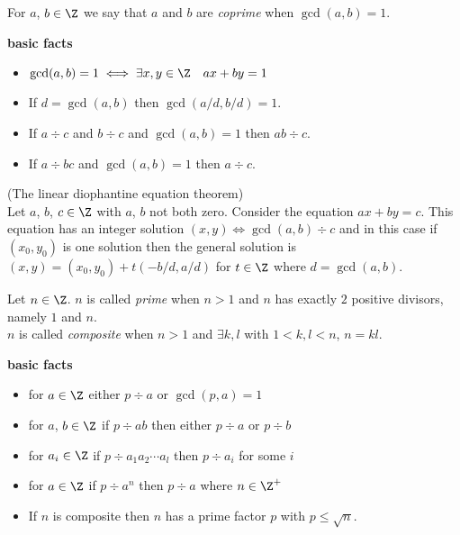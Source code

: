  For $a$, $b\in\Z$ we say that $a$ and $b$ are \emph{coprime} when $\gcd(a,b)=1$.

\textbf{basic facts}
\begin{itemize}
\item[] $\gcd(a,b)=1\iff\exists x,y\in\Z\quad ax+by=1$
\item[] If $d=\gcd(a,b)$ then $\gcd(a/d,b/d)=1$.
\item[] If $a\div c$ and $b\div c$ and $\gcd(a,b)=1$ then $ab\div c$.
\item[] If $a\div bc$ and $\gcd(a,b)=1$ then $a\div c$.
\end{itemize}

\thm (The linear diophantine equation theorem) \\
Let $a$, $b$, $c\in\Z$ with $a$, $b$ not both zero.  Consider the equation $ax+by=c$.  This equation has an integer solution $(x,y)\iff\gcd(a,b)\div c$ and in this case if $(x_0,y_0)$ is one solution then the general solution is $(x,y)=(x_0,y_0)+t(-b/d,a/d)$ for $t\in\Z$ where $d=\gcd(a,b)$.

 Let $n\in\Z$.  $n$ is called \emph{prime} when $n>1$ and $n$ has exactly $2$ positive divisors, namely $1$ and $n$. \\
$n$ is called \emph{composite} when $n>1$ and $\exists k,l$ with $1<k,l<n$, $n=kl$.

\textbf{basic facts}
\begin{itemize}
\item[] for $a\in\Z$ either $p\div a$ or $\gcd(p,a)=1$
\item[] for $a$, $b\in\Z$ if $p\div ab$ then either $p\div a$ or $p\div b$
\item[] for $a_i\in\Z$ if $p\div a_1a_2\dotsm a_l$ then $p\div a_i$ for some $i$
\item[] for $a\in\Z$ if $p\div a^n$ then $p\div a$ where $n\in\Z^+$
\item[] If $n$ is composite then $n$ has a prime factor $p$ with $p\leq\sqrt{n}$.
\end{itemize}
